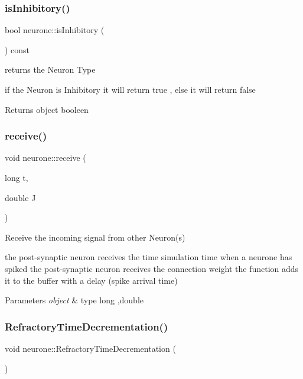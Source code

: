 \subsubsection{\texorpdfstring{is\+Inhibitory()}{isInhibitory()}}
{\footnotesize\ttfamily bool neurone\+::is\+Inhibitory (\begin{DoxyParamCaption}{ }\end{DoxyParamCaption}) const}



returns the Neuron Type 

if the Neuron is Inhibitory it will return true , else it will return false

\begin{DoxyReturn}{Returns}
object booleen 
\end{DoxyReturn}
\mbox{\label{classneurone_af1e157df98fa2c15cb70bc50032d39c0}} 
\subsubsection{\texorpdfstring{receive()}{receive()}}
{\footnotesize\ttfamily void neurone\+::receive (\begin{DoxyParamCaption}\item[{long}]{t,  }\item[{double}]{J }\end{DoxyParamCaption})}



Receive the incoming signal from other Neuron(s) 

the post-\/synaptic neuron receives the time simulation time when a neurone has spiked the post-\/synaptic neuron receives the connection weight the function add\textquotesingle{}s it to the buffer with a delay (spike arrival time) 
\begin{DoxyParams}{Parameters}
{\em object} & type long ,double \\
\hline
\end{DoxyParams}
\mbox{\label{classneurone_ae24b7ac8addb3cc7b1b08042066576e6}} 
\subsubsection{\texorpdfstring{Refractory\+Time\+Decrementation()}{RefractoryTimeDecrementation()}}
{\footnotesize\ttfamily void neurone\+::\+Refractory\+Time\+Decrementation (\begin{DoxyParamCaption}{ }\end{DoxyParamCaption})}



